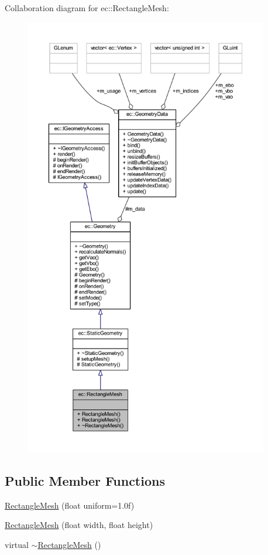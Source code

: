 Collaboration diagram for ec\+:\+:Rectangle\+Mesh\+:\nopagebreak
\begin{figure}[H]
\begin{center}
\leavevmode
\includegraphics[height=550pt]{classec_1_1_rectangle_mesh__coll__graph}
\end{center}
\end{figure}
\subsection*{Public Member Functions}
\begin{DoxyCompactItemize}
\item 
\mbox{\hyperlink{classec_1_1_rectangle_mesh_af31c484c4657eccf50e15ad60d0ed876}{Rectangle\+Mesh}} (float uniform=1.\+0f)
\item 
\mbox{\hyperlink{classec_1_1_rectangle_mesh_a30efa01609b3ff8d8f3d6139509b0c8c}{Rectangle\+Mesh}} (float width, float height)
\item 
virtual \mbox{\hyperlink{classec_1_1_rectangle_mesh_a520388a70dadc70155b2ade95f06d110}{$\sim$\+Rectangle\+Mesh}} ()
\end{DoxyCompactItemize}
